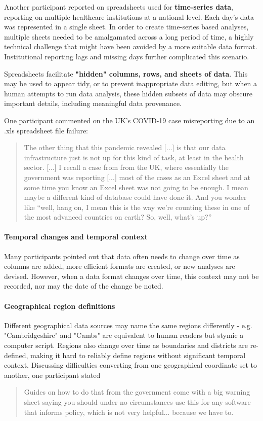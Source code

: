 \documentclass{CUP-JNL-DAP}%
\begin{document}
Another participant reported on spreadsheets used for \textbf{time-series data}, reporting on multiple healthcare institutions at a national level. Each day's data was represented in a single sheet. In order to create time-series based analyses, multiple sheets needed to be amalgamated across a long period of time, a highly technical challenge that might have been avoided by a more suitable data format. Institutional reporting lags and missing days further complicated this scenario. 

Spreadsheets facilitate \textbf{"hidden" columns, rows, and sheets of data}. This may be used to appear tidy, or to prevent inappropriate data editing, but when a human attempts to run data analysis, these hidden subsets of data may obscure important details, including meaningful data provenance.

One participant commented on the UK's COVID-19 case misreporting due to an .xls spreadsheet file failure: 
\blockquote{The other thing that this pandemic revealed [...] is that our data infrastructure just is not up for this kind of task, at least in the health sector. [...] I recall a case from from the UK, where essentially the government was reporting [...] most of the cases as an Excel sheet and at some time you know an Excel sheet was not going to be enough. I mean maybe a different kind of database could have done it. And you wonder like \enquote{well, hang on, I mean this is the way we're counting these in one of the most advanced countries on earth? So, well, what's up?}}

\paragraph{Temporal changes and temporal context}
Many participants pointed out that data often needs to change over time as columns are added, more efficient formats are created, or new analyses are devised. However, when a data format changes over time, this context may not be recorded, nor may the date of the change be noted. 

\paragraph{Geographical region definitions} 
Different geographical data sources may name the same regions differently - e.g. "Cambridgeshire" and "Cambs" are equivalent to human readers but stymie a computer script. Regions also change over time as boundaries and districts are re-defined, making it hard to reliably define regions without significant temporal context. Discussing difficulties converting from one geographical coordinate set to another, one participant stated 
\blockquote{Guides on how to do that from the government come with a big warning sheet saying you should under no circumstances use this for any software that informs policy, which is not very helpful... because we have to.}
\end{document}
